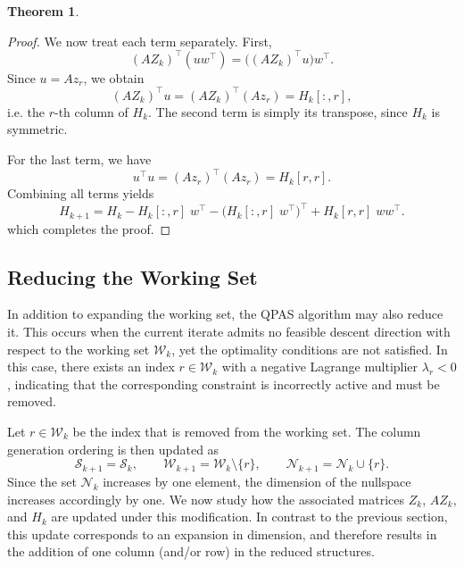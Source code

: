 \documentclass{book}
\theoremstyle{definition}
\newtheorem{theorem}{Theorem}[section]
\newcounter{algorithm_}
\numberwithin{algorithm_}{chapter}
\begin{document}
{\begin{theorem}
\begin{proof}
We now treat each term separately. First,
\begin{equation}
(AZ_k)^\top (u w^\top)
=
\bigl((AZ_k)^\top u\bigr) w^\top.
\end{equation}
Since \(u = A z_r\), we obtain
\begin{equation}
(AZ_k)^\top u
=
(AZ_k)^\top (A z_r)
=
H_k[:,r],
\end{equation}
i.e. the \(r\)-th column of \(H_k\). The second term is simply its transpose, since \(H_k\) is symmetric.

For the last term, we have
\begin{equation}
u^\top u
=
(A z_r)^\top (A z_r)
=
H_k[r,r].
\end{equation}
Combining all terms yields
\[
H_{k+1}
=
H_k
-
H_k[:,r] \; w^\top
-
\bigl(H_k[:,r] \; w^\top\bigr)^\top
+
H_k[r,r]\; w w^\top.
\]
which completes the proof.

\end{proof}
\end{theorem}

\newpage

\subsection{Reducing the Working Set}
\label{subsec:reducing_workingset}

In addition to expanding the working set, the QPAS algorithm may also reduce it. This occurs when the current iterate admits no feasible descent direction with respect to the working set \(\mathcal{W}_k\), yet the optimality conditions are not satisfied. In this case, there exists an index \(r \in \mathcal{W}_k\) with a negative Lagrange multiplier \(\lambda_r < 0\), indicating that the corresponding constraint is incorrectly active and must be removed.

\bigskip

Let \(r \in \mathcal{W}_k\) be the index that is removed from the working set. The column generation ordering is then updated as
\begin{equation}
\mathcal{S}_{k+1} = \mathcal{S}_k, 
\qquad
\mathcal{W}_{k+1} = \mathcal{W}_k \setminus \{r\}, 
\qquad
\mathcal{N}_{k+1} = \mathcal{N}_k \cup \{r\}.
\end{equation}
Since the set \(\mathcal{N}_k\) increases by one element, the dimension of the nullspace increases accordingly by one.
We now study how the associated matrices \(Z_k\), \(AZ_k\), and \(H_k\) are updated under this modification. In contrast to the previous section, this update corresponds to an expansion in dimension, and therefore results in the addition of one column (and/or row) in the reduced structures.

}
\end{document}
